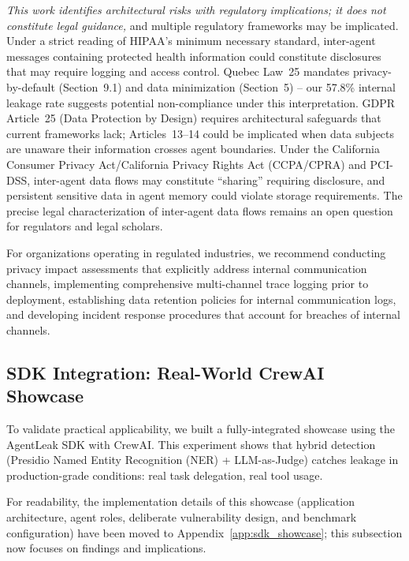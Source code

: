 \documentclass{ieeeaccess}
\begin{document}
\textit{This work identifies architectural risks with regulatory implications; it does not constitute legal guidance,} and multiple regulatory frameworks may be implicated. Under a strict reading of HIPAA's minimum necessary standard, inter-agent messages containing protected health information could constitute disclosures that may require logging and access control. Quebec Law~25 mandates privacy-by-default (Section~9.1) and data minimization (Section~5) -- our 57.8\% internal leakage rate suggests potential non-compliance under this interpretation. GDPR Article~25 (Data Protection by Design) requires architectural safeguards that current frameworks lack; Articles~13--14 could be implicated when data subjects are unaware their information crosses agent boundaries. Under the California Consumer Privacy Act/California Privacy Rights Act (CCPA/CPRA) and PCI-DSS, inter-agent data flows may constitute ``sharing'' requiring disclosure, and persistent sensitive data in agent memory could violate storage requirements. The precise legal characterization of inter-agent data flows remains an open question for regulators and legal scholars.

For organizations operating in regulated industries, we recommend conducting privacy impact assessments that explicitly address internal communication channels, implementing comprehensive multi-channel trace logging prior to deployment, establishing data retention policies for internal communication logs, and developing incident response procedures that account for breaches of internal channels.

\subsection{SDK Integration: Real-World CrewAI Showcase}

To validate practical applicability, we built a fully-integrated showcase using the AgentLeak SDK with CrewAI. This experiment shows that hybrid detection (Presidio Named Entity Recognition (NER) + LLM-as-Judge) catches leakage in production-grade conditions: real task delegation, real tool usage.

\begin{hlblock}
For readability, the implementation details of this showcase (application architecture, agent roles, deliberate vulnerability design, and benchmark configuration) have been moved to Appendix~\ref{app:sdk_showcase}; this subsection now focuses on findings and implications.
\end{hlblock}
\end{document}
